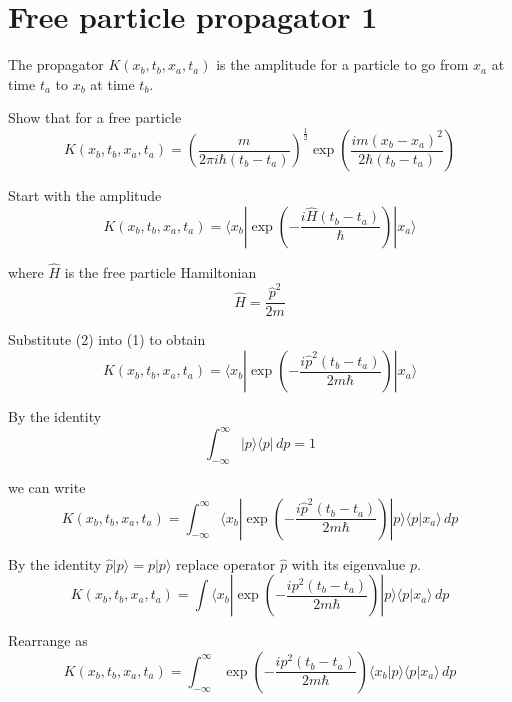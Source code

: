 

\section*{Free particle propagator 1}

The propagator $K(x_b,t_b,x_a,t_a)$ is the amplitude for a particle to go from $x_a$
at time $t_a$ to $x_b$ at time $t_b$.

\bigskip
Show that for a free particle
\begin{equation*}
K(x_b,t_b,x_a,t_a)=
\left(\frac{m}{2\pi i\hbar(t_b-t_a)}\right)^\frac{1}{2}
\exp\left(\frac{im(x_b-x_a)^2}{2\hbar(t_b-t_a)}\right)
\end{equation*}

Start with the amplitude
\begin{equation*}
K(x_b,t_b,x_a,t_a)=\langle x_b|\exp\left(-\frac{i\hat H(t_b-t_a)}{\hbar}\right)|x_a\rangle
\tag{1}
\end{equation*}

where $\hat H$ is the free particle Hamiltonian
\begin{equation*}
\hat H=\frac{\hat p^2}{2m}
\tag{2}
\end{equation*}

Substitute (2) into (1) to obtain
\begin{equation*}
K(x_b,t_b,x_a,t_a)=\langle x_b|\exp\left(-\frac{i\hat p^2(t_b-t_a)}{2m\hbar}\right)|x_a\rangle
\end{equation*}

By the identity
\begin{equation*}
\int_{-\infty}^\infty|p\rangle\langle p|\,dp=1
\end{equation*}

we can write
\begin{equation*}
K(x_b,t_b,x_a,t_a)=\int_{-\infty}^\infty
\langle x_b|\exp\left(-\frac{i\hat p^2(t_b-t_a)}{2m\hbar}\right)|p\rangle\langle p|x_a\rangle\,dp
\end{equation*}

By the identity $\hat p|p\rangle=p|p\rangle$ replace operator $\hat p$ with its eigenvalue $p$.
\begin{equation*}
K(x_b,t_b,x_a,t_a)=\int\langle x_b|\exp\left(-\frac{ip^2(t_b-t_a)}{2m\hbar}\right)|p\rangle\langle p|x_a\rangle\,dp
\end{equation*}

Rearrange as
\begin{equation*}
K(x_b,t_b,x_a,t_a)=\int_{-\infty}^\infty
\exp\left(-\frac{ip^2(t_b-t_a)}{2m\hbar}\right)\langle x_b|p\rangle\langle p|x_a\rangle\,dp
\end{equation*}

